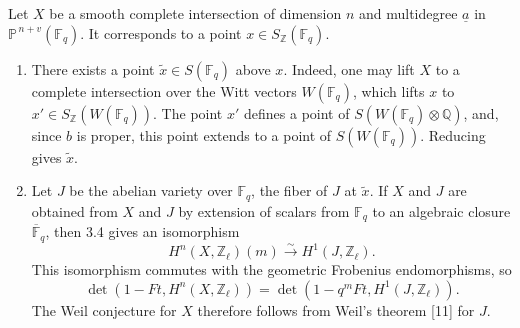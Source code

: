 \documentclass[10pt]{article}
\newcommand{\F}{\mathbb F}
\newcommand{\Pj}{\mathbb P}
\newcommand{\Q}{\mathbb Q}
\newcommand{\Z}{\mathbb Z}
\newcommand{\iso}{\xrightarrow{\sim}}
\begin{document}
Let \(X\) be a smooth complete intersection of dimension \(n\) and multidegree \(\underline a\) in \(\Pj^{\,n+v}(\F_q)\). It corresponds to a point \(x\in S_\Z(\F_q)\).
\begin{enumerate}[label=\alph*)]
\item There exists a point \(\tilde x\in S(\F_q)\) above \(x\). Indeed, one may lift \(X\) to a complete intersection over the Witt vectors \(W(\F_q)\), which lifts \(x\) to \(x'\in S_\Z(W(\F_q))\). The point \(x'\) defines a point of \(S(W(\F_q)\otimes\Q)\), and, since \(b\) is proper, this point extends to a point of \(S(W(\F_q))\). Reducing gives \(\tilde x\).
\item Let \(J\) be the abelian variety over \(\F_q\), the fiber of \(J\) at \(\tilde x\). If \(X\) and \(J\) are obtained from \(X\) and \(J\) by extension of scalars from \(\F_q\) to an algebraic closure \(\overline{\F}_q\), then 3.4 gives an isomorphism
\[
H^n(X,\Z_\ell)(m)\iso H^1(J,\Z_\ell).
\]
This isomorphism commutes with the geometric Frobenius endomorphisms, so
\[
\tag{3.5.1}
\det(1-Ft,H^n(X,\Z_\ell))=
\det(1-q^mFt,H^1(J,\Z_\ell)).
\]
The Weil conjecture for \(X\) therefore follows from Weil's theorem [11] for \(J\).
\end{enumerate}
\end{document}
